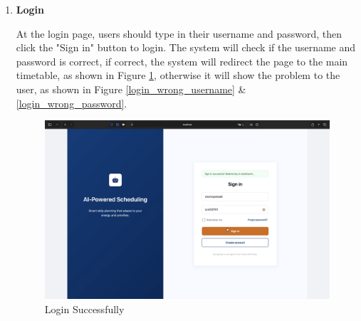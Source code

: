 \documentclass[12pt, a4paper]{article}
\begin{document}
            \begin{enumerate}
                \item \textbf{Login}
                
                    At the login page, users should type in their username and password, then click the "Sign in" button to login. The system will check if the username and password is correct, if correct, the system will redirect the page to the main timetable, as shown in Figure \ref{login_correct}, otherwise it will show the problem to the user, as shown in Figure \ref{login_wrong_username} \& \ref{login_wrong_password}. 
                    
                    \begin{figure}[H]
                        \centering
                        \includegraphics[width=\textwidth]{Images/System/login/redirect.png}
                        \caption{Login Successfully}
                        \label{login_correct}
                    \end{figure}
                    

\end{enumerate}
\end{document}
